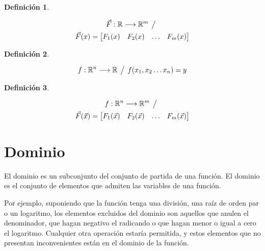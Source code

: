 \documentclass[a5paper,12pt,twoside]{book}
\newtheorem{defn}{{Definición}}[chapter]
\begin{document}
\begin{mdframed}[style=DefinitionFrame]
    \begin{defn}
    \end{defn}
    \begin{multline*}
        \Vec{F}:\mathbb{R} \longrightarrow \mathbb{R}^m \hspace{1ex} \big/ \hspace{1ex}
        \\
        \Vec{F}(x) = \begin{bmatrix} F_1(x) & F_2(x) & \dots & F_m(x) \end{bmatrix}
    \end{multline*}
\end{mdframed}

\begin{mdframed}[style=DefinitionFrame]
    \begin{defn}
    \end{defn}
    \begin{equation*}
        f:\mathbb{R}^n \longrightarrow \mathbb{R} \hspace{1ex} \big/ \hspace{1ex} f(x_1,x_2 \dots x_n)=y
    \end{equation*}
\end{mdframed}

\begin{mdframed}[style=DefinitionFrame]
    \begin{defn}
    \end{defn}
    \begin{multline*}
        f:\mathbb{R}^n \longrightarrow \mathbb{R}^m \hspace{1ex} \big/ \hspace{1ex}
        \\
        \Vec{F}(\Vec{x}) = \begin{bmatrix} F_1(\Vec{x}) & F_2(\Vec{x}) & \dots & F_m(\Vec{x}) \end{bmatrix}
    \end{multline*}
\end{mdframed}


\section{Dominio}

El dominio es un subconjunto del conjunto de partida de una función.
El dominio es el conjunto de elementos que admiten las variables de una función.

Por ejemplo, suponiendo que la función tenga una división, una raíz de orden par o un logaritmo, los elementos excluidos del dominio son aquellos que anulen el denominador, que hagan negativo el radicando o que hagan menor o igual a cero el logaritmo.
Cualquier otra operación estaría permitida, y estos elementos que no presentan inconvenientes están en el dominio de la función.
\end{document}
